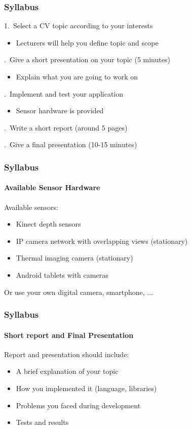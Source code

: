 \documentclass[xetex]{beamer}
\begin{document}
\begin{frame}
\frametitle{Syllabus}

1.\ Select a CV topic according to your interests
\begin{itemize}
	\item Lecturers will help you define topic and scope
\end{itemize}

.\ Give a short presentation on your topic (5 minutes)
\begin{itemize}
	\item Explain what you are going to work on
\end{itemize}

.\ Implement and test your application
\begin{itemize}
	\item Sensor hardware is provided
\end{itemize}

.\ Write a short report (around 5 pages)

.\ Give a final presentation (10-15 minutes)

\end{frame}


\begin{frame}
\frametitle{Syllabus}
\framesubtitle{Available Sensor Hardware}

Available sensors:
\begin{itemize}
	\item Kinect depth sensors
	\item IP camera network with overlapping views (stationary)
	\item Thermal imaging camera (stationary)
	\item Android tablets with cameras
\end{itemize}

\bigskip
Or use your own digital camera, smartphone, ...

\end{frame}


\begin{frame}
\frametitle{Syllabus}
\framesubtitle{Short report and Final Presentation}

Report and presentation should include:
\begin{itemize} 
	\item A brief explanation of your topic
	\item How you implemented it (language, libraries)
	\item Problems you faced during development
	\item Tests and results
\end{itemize}

\end{frame}
\end{document}
